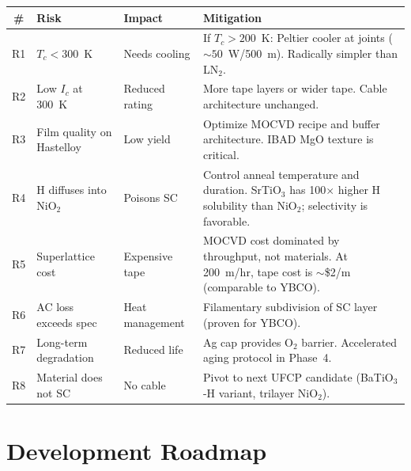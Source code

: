 \documentclass[11pt, a4paper]{article}
\begin{document}
\begin{center}
\begin{tabular}{@{}cp{2.5cm}p{2.5cm}p{5cm}@{}}
\toprule
\textbf{\#} & \textbf{Risk} & \textbf{Impact} & \textbf{Mitigation} \\
\midrule
R1 & $T_c < 300$~K & Needs cooling & If $T_c > 200$~K: Peltier cooler at
    joints ($\sim 50$~W/500~m). Radically simpler than LN$_2$. \\
R2 & Low $I_c$ at 300~K & Reduced rating & More tape layers or wider tape.
    Cable architecture unchanged. \\
R3 & Film quality on Hastelloy & Low yield & Optimize MOCVD recipe and
    buffer architecture. IBAD MgO texture is critical. \\
R4 & H diffuses into NiO$_2$ & Poisons SC & Control anneal temperature
    and duration. SrTiO$_3$ has 100$\times$ higher H solubility
    than NiO$_2$; selectivity is favorable. \\
R5 & Superlattice cost & Expensive tape & MOCVD cost dominated by
    throughput, not materials. At 200~m/hr, tape cost is
    $\sim$\$2/m (comparable to YBCO). \\
R6 & AC loss exceeds spec & Heat management & Filamentary subdivision of
    SC layer (proven for YBCO). \\
R7 & Long-term degradation & Reduced life & Ag cap provides O$_2$ barrier.
    Accelerated aging protocol in Phase~4. \\
R8 & Material does not SC & No cable & Pivot to next UFCP candidate
    (BaTiO$_3$-H variant, trilayer NiO$_2$). \\
\bottomrule
\end{tabular}
\end{center}

\section{Development Roadmap}
\label{sec:roadmap}
\end{document}
